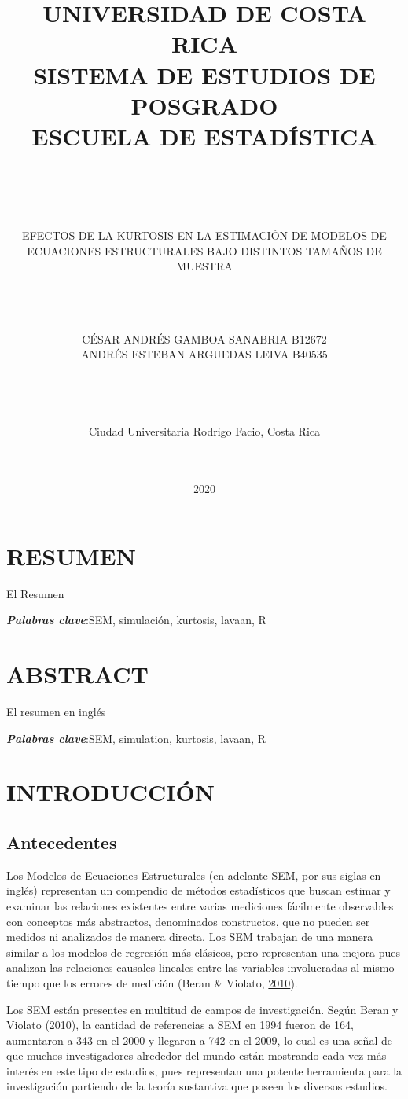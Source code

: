 \documentclass[
]{article}
\title{UNIVERSIDAD DE COSTA RICA\\
SISTEMA DE ESTUDIOS DE POSGRADO\\
ESCUELA DE ESTADÍSTICA\\
~\\
~\\}
\subtitle{EFECTOS DE LA KURTOSIS EN LA ESTIMACIÓN DE MODELOS DE ECUACIONES
ESTRUCTURALES BAJO DISTINTOS TAMAÑOS DE MUESTRA\\
~\\
~\\
~\\}
\author{CÉSAR ANDRÉS GAMBOA SANABRIA B12672\\
ANDRÉS ESTEBAN ARGUEDAS LEIVA B40535\\
~\\
~\\
~\\
~\\
Ciudad Universitaria Rodrigo Facio, Costa Rica\\
~\\
~\\}
\date{2020}
\begin{document}
\maketitle

\cleardoublepage

\newpage

\section*{RESUMEN}

El Resumen

\textbf{\emph{Palabras clave}}:SEM, simulación, kurtosis, lavaan, R
\cleardoublepage

\section*{ABSTRACT}

El resumen en inglés

\textbf{\emph{Palabras clave}}:SEM, simulation, kurtosis, lavaan, R
\cleardoublepage

\newpage

\tableofcontents
\cleardoublepage
{}

\newpage

\section{INTRODUCCIÓN}

\subsection{Antecedentes}

Los Modelos de Ecuaciones Estructurales (en adelante SEM, por sus siglas
en inglés) representan un compendio de métodos estadísticos que buscan
estimar y examinar las relaciones existentes entre varias mediciones
fácilmente observables con conceptos más abstractos, denominados
constructos, que no pueden ser medidos ni analizados de manera directa.
Los SEM trabajan de una manera similar a los modelos de regresión más
clásicos, pero representan una mejora pues analizan las relaciones
causales lineales entre las variables involucradas al mismo tiempo que
los errores de medición (Beran \& Violato,
\protect\hyperlink{ref-Beran2010StructuralEM}{2010}).

Los SEM están presentes en multitud de campos de investigación. Según
Beran y Violato (2010), la cantidad de referencias a SEM en 1994 fueron
de 164, aumentaron a 343 en el 2000 y llegaron a 742 en el 2009, lo cual
es una señal de que muchos investigadores alrededor del mundo están
mostrando cada vez más interés en este tipo de estudios, pues
representan una potente herramienta para la investigación partiendo de
la teoría sustantiva que poseen los diversos estudios.
\end{document}
